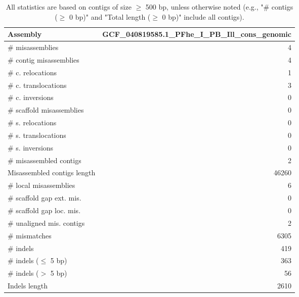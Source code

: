 \documentclass[12pt,a4paper]{article}
\begin{document}
\begin{table}[ht]
\begin{center}
\caption{All statistics are based on contigs of size $\geq$ 500 bp, unless otherwise noted (e.g., "\# contigs ($\geq$ 0 bp)" and "Total length ($\geq$ 0 bp)" include all contigs).}
\begin{tabular}{|l*{1}{|r}|}
\hline
Assembly & GCF\_040819585.1\_PFhe\_I\_PB\_Ill\_cons\_genomic \\ \hline
\# misassemblies & 4 \\ \hline
\hspace{2mm}\# contig misassemblies & 4 \\ \hline
\hspace{5mm}\# c. relocations & 1 \\ \hline
\hspace{5mm}\# c. translocations & 3 \\ \hline
\hspace{5mm}\# c. inversions & 0 \\ \hline
\hspace{2mm}\# scaffold misassemblies & 0 \\ \hline
\hspace{5mm}\# s. relocations & 0 \\ \hline
\hspace{5mm}\# s. translocations & 0 \\ \hline
\hspace{5mm}\# s. inversions & 0 \\ \hline
\# misassembled contigs & 2 \\ \hline
Misassembled contigs length & 46260 \\ \hline
\# local misassemblies & 6 \\ \hline
\# scaffold gap ext. mis. & 0 \\ \hline
\# scaffold gap loc. mis. & 0 \\ \hline
\# unaligned mis. contigs & 2 \\ \hline
\# mismatches & 6305 \\ \hline
\# indels & 419 \\ \hline
\hspace{5mm}\# indels ($\leq$ 5 bp) & 363 \\ \hline
\hspace{5mm}\# indels ($>$ 5 bp) & 56 \\ \hline
Indels length & 2610 \\ \hline
\end{tabular}
\end{center}
\end{table}
\end{document}
